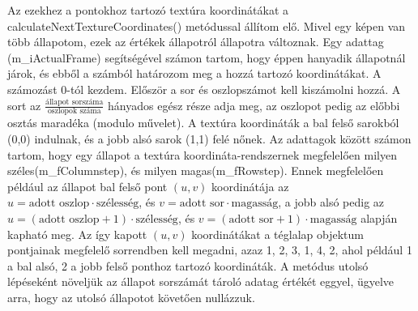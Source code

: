Az ezekhez a pontokhoz tartozó textúra koordinátákat a calculateNextTextureCoordinates() metódussal állítom elő. Mivel egy képen van több állapotom, ezek az értékek állapotról állapotra változnak. Egy adattag (m\_iActualFrame) segítségével számon tartom, hogy éppen hanyadik állapotnál járok, és ebből a számból határozom meg a hozzá tartozó koordinátákat. A számozást 0-tól kezdem. Először a sor és oszlopszámot kell kiszámolni hozzá. A sort az $\frac{\text{állapot sorszáma}}{\text{oszlopok száma}}$ hányados egész része adja meg, az oszlopot pedig az előbbi osztás maradéka (modulo művelet). A textúra koordináták a bal felső sarokból (0,0) indulnak, és a jobb alsó sarok (1,1) felé nőnek. Az adattagok között számon tartom, hogy egy állapot a textúra koordináta-rendszernek megfelelően milyen széles(m\_fColumnstep), és milyen magas(m\_fRowstep). Ennek megfelelően például az állapot bal felső pont $(u, v)$ koordinátája az $u=\text{adott oszlop} \cdot \text{szélesség}$, és $v=\text{adott sor} \cdot \text{magasság}$, a jobb alsó pedig az  $u=(\text{adott oszlop} + 1) \cdot \text{szélesség}$, és $v=(\text{adott sor} + 1) \cdot \text{magasság}$ alapján kapható meg. Az így kapott $(u, v)$ koordinátákat a téglalap objektum pontjainak megfelelő sorrendben kell megadni, azaz 1, 2, 3, 1, 4, 2, ahol például 1 a bal alsó, 2 a jobb felső ponthoz tartozó koordináták. A metódus utolsó lépéseként növeljük az állapot sorszámát tároló adatag értékét eggyel, ügyelve arra, hogy az utolsó állapotot követően nullázzuk.

